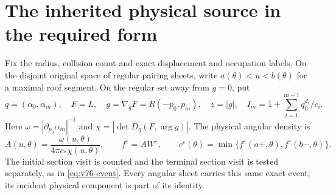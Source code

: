 \documentclass[11pt,reqno]{amsart}
\numberwithin{equation}{section}
\theoremstyle{definition}\newtheorem{definition}[theorem]{Definition}
\theoremstyle{remark}\newtheorem{remark}[theorem]{Remark}
\begin{document}
\section{The inherited physical source in the required form}
Fix the radius, collision count and exact displacement and occupation
labels. On the disjoint original space of regular pairing sheets,
write $a(\theta)<u<b(\theta)$ for a maximal roof segment. On the regular set away from $g=0$, put
\[
 q=(\alpha_0,\alpha_m),\quad F=L,\quad
 g=\nabla_qF=R(-p_0,p_m),\quad z=|g|,\quad
 I_m=1+\sum_{i=1}^{m-1}q_0^{d_i}/c_i.
\]
Here $\omega=|\partial_{p_0}\alpha_m|^{-1}$ and
$\chi=|\det D_q(F,\arg g)|$. The physical angular density is
\[
 A(u,\theta)=\frac{\omega(u,\theta)}{4\pi c_*\chi(u,\theta)},
 \qquad f^\varepsilon=A W^\varepsilon,
 \qquad c^\varepsilon(\theta)
     =\min\{f^\varepsilon(a+,\theta),f^\varepsilon(b-,\theta)\}.
\]
The initial section visit is counted and the terminal section visit
is tested separately, as in \eqref{eq:v76-event}. Every angular
sheet carries this same exact event; its incident physical component
is part of its identity.
\end{document}
